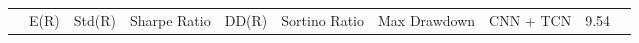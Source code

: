 \begin{tabular}{lrrrrrrrrr}
 & E(R) & Std(R) & Sharpe Ratio & DD(R) & Sortino Ratio & Max Drawdown & %
CNN + TCN & 9.54%
\end{tabular}
